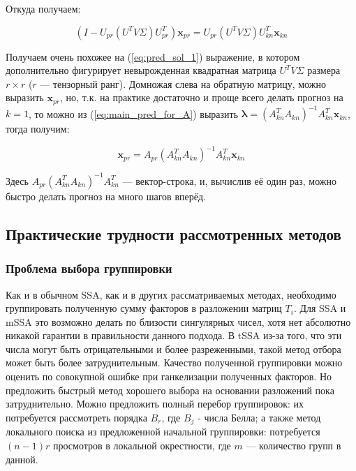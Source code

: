 			 Откуда получаем:
			 
			 \begin{equation}
			 	(I - U_{pr} (U^T V \Sigma) U_{pr}^T) \mathbf{x}_{pr} = U_{pr} (U^T V \Sigma) U_{kn}^T \mathbf{x}_{kn}
			 \end{equation}
			 
			 Получаем очень похожее на (\ref{eq:pred_sol_1}) выражение, в котором дополнительно фигурирует невырожденная квадратная матрица $ U^T V \Sigma $ размера $  r \times r$ ($ r $ --- тензорный ранг). Домножая слева на обратную матрицу, можно выразить $ \mathbf{x}_{pr} $, но, т.к. на практике достаточно и проще всего делать прогноз на $ k = 1 $, то можно из (\ref{eq:main_pred_for_A}) выразить $ \boldsymbol{\lambda} = (A_{kn}^T A_{kn})^{-1} A_{kn}^T \mathbf{x}_{kn} $, тогда получим:
			 
			 \begin{equation}
			 	\mathbf{x}_{pr} = A_{pr} (A_{kn}^T A_{kn})^{-1} A_{kn}^T \mathbf{x}_{kn}
			 \end{equation}
			 
			 Здесь $ A_{pr} (A_{kn}^T A_{kn})^{-1} A_{kn}^T $ --- вектор-строка, и, вычислив её один раз, можно быстро делать прогноз на много шагов вперёд.
			 
			 
			 \subsection*{Практические трудности рассмотренных методов}
			 	
			 	\subsubsection*{Проблема выбора группировки}
			 	
			 		Как и в обычном SSA, как и в других рассматриваемых методах, необходимо группировать полученную сумму факторов в разложении матриц $ T_i $. Для SSA и mSSA это возможно делать по близости сингулярных чисел, хотя нет абсолютно никакой гарантии в правильности данного подхода. В tSSA из-за того, что эти числа могут быть отрицательными и более разреженными, такой метод отбора может быть более затруднительным. Качество полученной группировки можно оценить по совокупной ошибке при ганкелизации полученных факторов. Но предложить быстрый метод хорошего выбора на основании разложений пока затруднительно. Можно предложить полный перебор группировок: их потребуется рассмотреть порядка $ B_r $, где $ B_j $ - числа Белла; а также метод локального поиска из предложенной начальной группировки: потребуется $ (n - 1) r $ просмотров в локальной окрестности, где $ m $ --- количество групп в данной.
			 		
